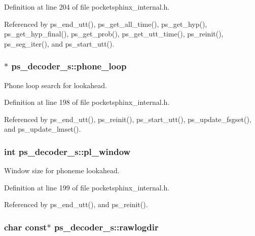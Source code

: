 Definition at line 204 of file pocketsphinx\-\_\-internal.\-h.



Referenced by ps\-\_\-end\-\_\-utt(), ps\-\_\-get\-\_\-all\-\_\-time(), ps\-\_\-get\-\_\-hyp(), ps\-\_\-get\-\_\-hyp\-\_\-final(), ps\-\_\-get\-\_\-prob(), ps\-\_\-get\-\_\-utt\-\_\-time(), ps\-\_\-reinit(), ps\-\_\-seg\-\_\-iter(), and ps\-\_\-start\-\_\-utt().

\subsubsection[{phone\-\_\-loop}]{$\ast$ ps\-\_\-decoder\-\_\-s\-::phone\-\_\-loop}\label{structps__decoder__s_a0c6d141d7a71a1287be00a1ebcc7643d}


Phone loop search for lookahead. 



Definition at line 198 of file pocketsphinx\-\_\-internal.\-h.



Referenced by ps\-\_\-end\-\_\-utt(), ps\-\_\-reinit(), ps\-\_\-start\-\_\-utt(), ps\-\_\-update\-\_\-fsgset(), and ps\-\_\-update\-\_\-lmset().

\subsubsection[{pl\-\_\-window}]{\setlength{\rightskip}{0pt plus 5cm}int ps\-\_\-decoder\-\_\-s\-::pl\-\_\-window}\label{structps__decoder__s_a0f0a6681ffd98af789f6bed556c814e4}


Window size for phoneme lookahead. 



Definition at line 199 of file pocketsphinx\-\_\-internal.\-h.



Referenced by ps\-\_\-end\-\_\-utt(), and ps\-\_\-reinit().

\subsubsection[{rawlogdir}]{\setlength{\rightskip}{0pt plus 5cm}char const$\ast$ ps\-\_\-decoder\-\_\-s\-::rawlogdir}\label{structps__decoder__s_aa2610c52a9267ee18ca095169bf34bfd}


